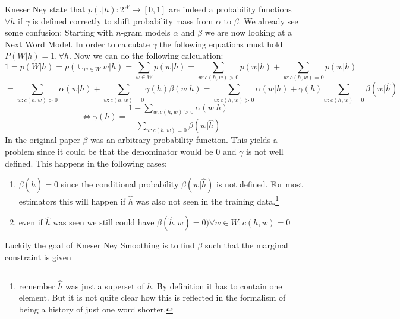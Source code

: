 \documentclass[•]{book}
\begin{document}
\begin{appendix}
Kneser Ney state that $p(.|h):2^W\rightarrow [0,1]$ are indeed a probability functions $\forall h$ if $\gamma$ is defined correctly to shift probability mass from $\alpha$ to $\beta$. 
We already see some confusion: Starting with $n$-gram models $\alpha$ and $\beta$ we are now looking at a Next Word Model. 
In order to calculate $\gamma$ the following equations must hold $P(W|h)=1, \forall h$.
Now we can do the following calculation:
\[
1=p(W|h)=p(\cup_{w\in W}w|h)=\sum_{w\in W}p(w|h)=
\sum_{w:c(h,w)>0}p(w|h)+\sum_{w:c(h,w)=0}p(w|h)
\]
\[
=\sum_{w:c(h,w)>0}\alpha(w|h)+\sum_{w:c(h,w)=0}\gamma(h)\beta(w|h) = \sum_{w:c(h,w)>0}\alpha(w|h)+\gamma(h)\sum_{w:c(h,w)=0}\beta(w|\hat h)
\] 
\[
\iff \gamma(h)=\frac{1-\sum_{w:c(h,w)>0}\alpha(w|h)}{\sum_{w:c(h,w)=0}\beta(w|\hat h)}
\]
In the original paper $\beta$ was an arbitrary probability function. 
This yields a problem since it could be that the denominator would be $0$ and $\gamma$ is not well defined. 
This happens in the following cases:
\begin{enumerate}
\item $\beta(\hat h)=0$ since the conditional probability $\beta(w|\hat h)$ is not defined. For most estimators this will happen if $\hat h$ was also not seen in the training data.\footnote{remember $\hat h$ was just a superset of $h$. By definition it has to contain one element. But it is not quite clear how this is reflected in the formalism of being a history of just one word shorter.}
\item even if $\hat h$ was seen we still could have $\beta(\hat h,w)=0)\forall w\in W : c(h,w)=0$
\end{enumerate}
Luckily the goal of Kneser Ney Smoothing is to find $\beta$ such that the marginal constraint is given  


\end{appendix}
\end{document}
